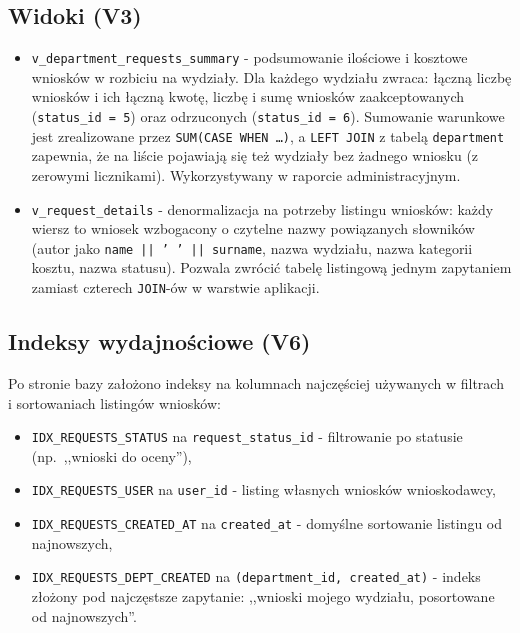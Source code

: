 \documentclass[12pt,a4paper]{article}
\begin{document}
\subsection{Widoki (V3)}
\begin{itemize}[leftmargin=*]
  \item \texttt{v\_department\_requests\_summary} - podsumowanie ilościowe
        i kosztowe wniosków w rozbiciu na wydziały. Dla każdego wydziału zwraca:
        łączną liczbę wniosków i ich łączną kwotę, liczbę i sumę wniosków
        zaakceptowanych (\texttt{status\_id = 5}) oraz odrzuconych
        (\texttt{status\_id = 6}). Sumowanie warunkowe jest zrealizowane
        przez \texttt{SUM(CASE WHEN \ldots)}, a \texttt{LEFT JOIN} z tabelą
        \texttt{department} zapewnia, że na liście pojawiają się też
        wydziały bez żadnego wniosku (z zerowymi licznikami).
        Wykorzystywany w raporcie administracyjnym.
  \item \texttt{v\_request\_details} - denormalizacja na potrzeby listingu
        wniosków: każdy wiersz to wniosek wzbogacony o czytelne nazwy
        powiązanych słowników (autor jako \texttt{name || ' ' || surname},
        nazwa wydziału, nazwa kategorii kosztu, nazwa statusu). Pozwala
        zwrócić tabelę listingową jednym zapytaniem zamiast czterech
        \texttt{JOIN}-ów w warstwie aplikacji.
\end{itemize}

\subsection{Indeksy wydajnościowe (V6)}
Po stronie bazy założono indeksy na kolumnach najczęściej używanych
w filtrach i sortowaniach listingów wniosków:

\begin{itemize}[leftmargin=*]
  \item \texttt{IDX\_REQUESTS\_STATUS} na \texttt{request\_status\_id}
        - filtrowanie po statusie (np.\ ,,wnioski do oceny''),
  \item \texttt{IDX\_REQUESTS\_USER} na \texttt{user\_id}
        - listing własnych wniosków wnioskodawcy,
  \item \texttt{IDX\_REQUESTS\_CREATED\_AT} na \texttt{created\_at}
        - domyślne sortowanie listingu od najnowszych,
  \item \texttt{IDX\_REQUESTS\_DEPT\_CREATED} na \texttt{(department\_id,
        created\_at)} - indeks złożony pod najczęstsze zapytanie:
        ,,wnioski mojego wydziału, posortowane od najnowszych''.
\end{itemize}
\end{document}
